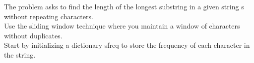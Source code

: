 \documentclass[preview]{standalone}
\begin{document}
The problem asks to find the length of the longest substring in a given string s without repeating characters.\\Use the sliding window technique where you maintain a window of characters without duplicates.\\Start by initializing a dictionary sfreq to store the frequency of each character in the string.\\
\end{document}
